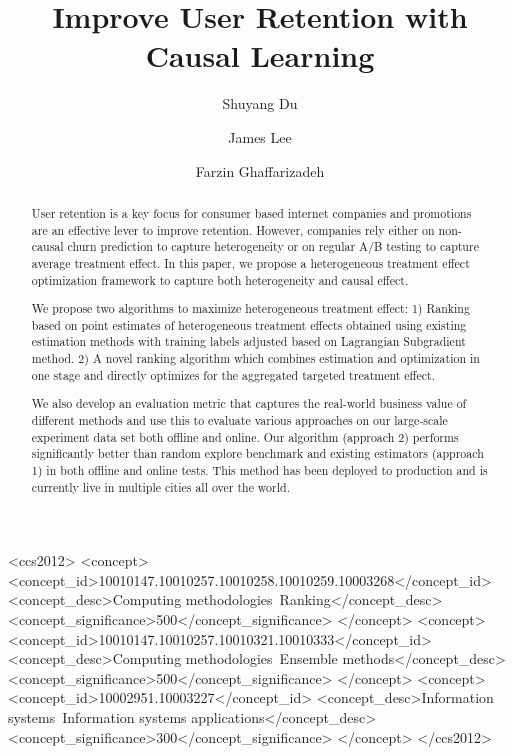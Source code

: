 \documentclass[sigconf]{acmart}
\begin{document}
\title{Improve User Retention with Causal Learning}

\author{Shuyang Du}

\author{James Lee}

\author{Farzin Ghaffarizadeh}



\begin{abstract}
User retention is a key focus for consumer based internet companies and promotions are an effective lever to improve retention. However, companies rely either on non-causal churn prediction to capture heterogeneity or on regular A/B testing to capture average treatment effect. In this paper, we propose a heterogeneous treatment effect optimization framework to capture both heterogeneity and causal effect.

We propose two algorithms to maximize heterogeneous treatment effect: 1) Ranking based on point estimates of heterogeneous treatment effects obtained using existing estimation methods with training labels adjusted based on Lagrangian Subgradient method. 2) A novel ranking algorithm which combines estimation and optimization in one stage and directly optimizes for the aggregated targeted treatment effect.

We also develop an evaluation metric that captures the real-world business value of different methods and use this to evaluate various approaches on our large-scale experiment data set both offline and online. Our algorithm (approach 2) performs significantly better than random explore benchmark and existing estimators (approach 1) in both offline and online tests. This method has been deployed to production and is currently live in multiple cities all over the world.
\end{abstract}

%
%
\begin{CCSXML}
<ccs2012>
<concept>
<concept_id>10010147.10010257.10010258.10010259.10003268</concept_id>
<concept_desc>Computing methodologies~Ranking</concept_desc>
<concept_significance>500</concept_significance>
</concept>
<concept>
<concept_id>10010147.10010257.10010321.10010333</concept_id>
<concept_desc>Computing methodologies~Ensemble methods</concept_desc>
<concept_significance>500</concept_significance>
</concept>
<concept>
<concept_id>10002951.10003227</concept_id>
<concept_desc>Information systems~Information systems applications</concept_desc>
<concept_significance>300</concept_significance>
</concept>
</ccs2012>
\end{CCSXML}
\end{document}
